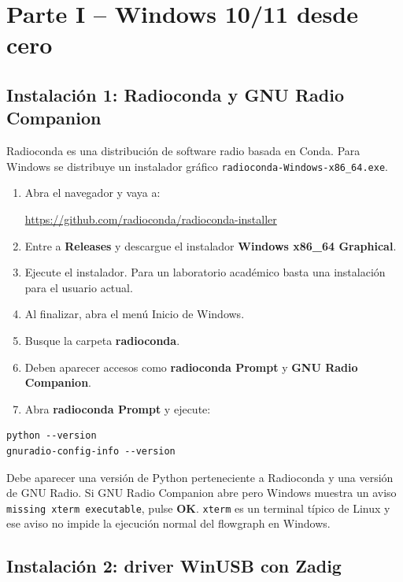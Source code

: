 \clearpage
\section{Parte I -- Windows 10/11 desde cero}

\subsection{Instalación 1: Radioconda y GNU Radio Companion}

Radioconda es una distribución de software radio basada en Conda. Para Windows se distribuye un instalador gráfico \texttt{radioconda-Windows-x86\_64.exe}.

\begin{enumerate}
    \item Abra el navegador y vaya a:
    \begin{center}
    \url{https://github.com/radioconda/radioconda-installer}
    \end{center}
    \item Entre a \textbf{Releases} y descargue el instalador \textbf{Windows x86\_64 Graphical}.
    \item Ejecute el instalador. Para un laboratorio académico basta una instalación para el usuario actual.
    \item Al finalizar, abra el menú Inicio de Windows.
    \item Busque la carpeta \textbf{radioconda}.
    \item Deben aparecer accesos como \textbf{radioconda Prompt} y \textbf{GNU Radio Companion}.
    \item Abra \textbf{radioconda Prompt} y ejecute:
\end{enumerate}

\begin{lstlisting}
python --version
gnuradio-config-info --version
\end{lstlisting}

\begin{esperado}
Debe aparecer una versión de Python perteneciente a Radioconda y una versión de GNU Radio. Si GNU Radio Companion abre pero Windows muestra un aviso \texttt{missing xterm executable}, pulse \textbf{OK}. \texttt{xterm} es un terminal típico de Linux y ese aviso no impide la ejecución normal del flowgraph en Windows.
\end{esperado}

\subsection{Instalación 2: driver WinUSB con Zadig}

